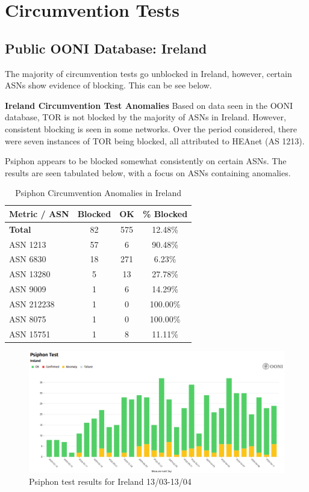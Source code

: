 \section{Circumvention Tests}
\subsection{Public OONI Database: Ireland}

The majority of circumvention tests go unblocked in Ireland, however, certain ASNs show evidence of blocking. This can be see below.

\textbf{Ireland Circumvention Test Anomalies}
Based on data seen in the OONI database, TOR is not blocked by the majority of ASNs in Ireland. However, consistent blocking is seen in some networks. Over the period considered, there were seven instances of TOR being blocked, all attributed to HEAnet (AS 1213).

Psiphon appears to be blocked somewhat consistently on certain ASNs. The results are seen tabulated below, with a focus on ASNs containing anomalies.

\begin{table}[H]
\centering
\caption{Psiphon Circumvention Anomalies in Ireland}
\begin{tabular}{lccc}
\toprule
\textbf{Metric / ASN} & \textbf{Blocked} & \textbf{OK} & \textbf{\% Blocked} \\
\midrule
\textbf{Total}     & 82  & 575 & 12.48\% \\
\midrule
ASN 1213           & 57  & 6   & 90.48\% \\
ASN 6830           & 18  & 271 & 6.23\% \\
ASN 13280          & 5   & 13  & 27.78\% \\
ASN 9009           & 1   & 6   & 14.29\% \\
ASN 212238         & 1   & 0   & 100.00\% \\
ASN 8075           & 1   & 0   & 100.00\% \\
ASN 15751          & 1   & 8   & 11.11\% \\
\bottomrule
\end{tabular}
\label{tab:psiphon_ireland}
\end{table}



\begin{figure} [H]
    \centering
    \includegraphics[width=0.5\linewidth]{IREDBPSI.png}
    \caption{Psiphon test results for Ireland 13/03-13/04}
    \label{fig:enter-label}
\end{figure}

